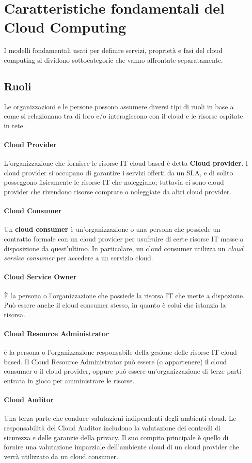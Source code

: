 \chapter{Caratteristiche fondamentali del Cloud Computing}
I modelli fondamentali usati per definire servizi, proprietà e fasi del cloud computing si dividono sottocategorie che vanno affrontate separatamente.
\section{Ruoli}
Le organizzazioni e le persone possono assumere diversi tipi di ruoli in base a come si relazionano tra di loro e/o interagiscono con il cloud e le risorse ospitate in rete.
\subsubsection{Cloud Provider}
L'organizzazione che fornisce le risorse IT cloud-based è detta \textbf{Cloud provider}. I cloud provider si occupano di garantire i servizi offerti da un SLA, e di solito posseggono fisicamente le risorse IT che noleggiano; tuttavia ci sono cloud provider che rivendono risorse comprate o noleggiate da altri cloud provider.
\subsubsection{Cloud Consumer}
Un \textbf{cloud consumer} è un'organizzazione o una persona che possiede un contratto formale con un cloud provider per usufruire di certe risorse IT messe a disposizione da quest'ultimo. In particolare, un cloud consumer utilizza un \textit{cloud service consumer} per accedere a un servizio cloud.
\subsubsection{Cloud Service Owner}
È la persona o l'organizzazione che possiede la risorsa IT che mette a dispozione. Può essere anche il cloud consumer stesso, in quanto è colui che istanzia la risorsa.
\subsubsection{Cloud Resource Administrator}
è la persona o l'organizzazione responsabile della gesione delle risorse IT cloud-based. Il Cloud Resource Administrator può essere (o appartenere) il cloud consumer o il cloud provider, oppure può essere un'organizzazione di terze parti entrata in gioco per amministrare le risorse.
\subsubsection{Cloud Auditor}
Una terza parte che conduce valutazioni indipendenti degli ambienti cloud. Le responsabilità del Cloud Auditor includono la valutazione dei controlli di sicurezza e delle garanzie della privacy. Il suo compito principale è quello di fornire una valutazione imparziale dell'ambiente cloud di un cloud provider che verrà utilizzato da un cloud consumer.

